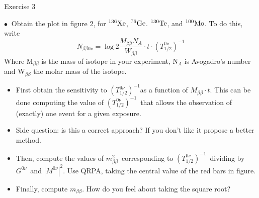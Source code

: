 \documentclass [aspectratio=169]{beamer}
\newcommand{\bbonu}{\ensuremath{\beta\beta0\nu}}
\newcommand{\mbb}{\ensuremath{m_{\beta\beta}}}
\newcommand{\mbbsq}{\ensuremath{m_{\beta\beta}^2}}
\newcommand{\tonu}{\ensuremath{(T_{1/2}^{0\nu})^{-1}}}
\newcommand{\gonu}{\ensuremath{G^{0\nu}}}
\newcommand{\monu}{\ensuremath{|M^{0\nu}|^2}}
\newcommand{\XE}{\ensuremath{{}^{136}{\rm Xe}}}
\newcommand{\GE}{\ensuremath{{}^{76}{\rm Ge}}}
\newcommand{\TE}{\ensuremath{{}^{130}{\rm Te}}}
\newcommand{\MO}{\ensuremath{{}^{100}{\rm Mo}}}
\begin{document}
\begin{frame}{Exercise 3}

$\bullet~$ Obtain the plot in figure 2, for \XE, \GE. \TE, and \MO. To do this, write
\[
N_{\bbonu} = \log{2} \frac{M_{\beta\beta} N_A}{W_{\beta\beta}}\cdot t \cdot \tonu
\]
Where M$_{\beta\beta}$ is the mass of isotope in your experiment, N$_A$ is Avogadro's number and
W$_{\beta\beta}$ the molar mass of the isotope. 

\begin{itemize}
\item  {\color{uwopurple} First obtain the sensitivity to \tonu as a function of $ M_{\beta\beta} \cdot t$. This can be done computing the value of \tonu\ that allows the observation of (exactly) one event for a given exposure.}
\item  {\color{uwopurple} Side question: is this a correct approach? If you don't like it propose a better method.}  
\item  {\color{uwopurple} Then, compute the values of \mbbsq\ corresponding to \tonu\ dividing by \gonu\ and \monu. Use QRPA, taking the central value of the red bars in figure. }
\item {\color{uwopurple} Finally, compute \mbb. How do you feel about taking the square root? 
} 
\end{itemize}

\end{frame}




\end{document}
